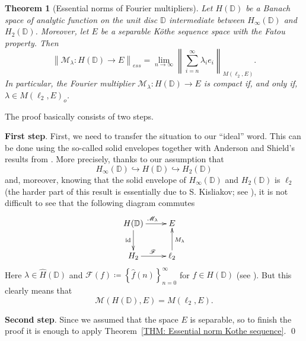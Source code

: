 \documentclass[11pt]{amsart}
\theoremstyle{definition}
\newtheorem{theorem}{Theorem}[section]
\theoremstyle{definition}
\theoremstyle{definition}
\theoremstyle{definition}
\theoremstyle{definition}
\theoremstyle{definition}
\theoremstyle{definition}
\theoremstyle{definition}
\numberwithin{equation}{section}
\numberwithin{equation}{section}
\numberwithin{equation}{section}
\theoremstyle{definition}
\theoremstyle{definition}
\theoremstyle{definition}
\theoremstyle{definition}
\theoremstyle{definition}
\theoremstyle{definition}
\newcommand{\norm}[1]{\left\lVert#1\right\rVert}
\renewenvironment{proof}{\noindent {\bf Proof.}}{\qed}
\begin{document}
\begin{theorem}[Essential norms of Fourier multipliers] \label{THM: ess norm holomorphic}
	{\it Let $H(\mathbb{D})$ be a Banach space of analytic function on the unit disc $\mathbb{D}$ intermediate between $H_{\infty}(\mathbb{D})$
		and $H_2(\mathbb{D})$. Moreover, let $E$ be a separable K{\" o}the sequence space with the Fatou property. Then}
		\begin{equation*}
			\norm{\mathscr{M}_{\lambda} \colon H(\mathbb{D}) \rightarrow E}_{ess} = \lim\limits_{n \rightarrow \infty} \norm{ \sum_{i=n}^{\infty} \lambda_i e_i }_{M(\ell_2,E)}.
		\end{equation*}
		{\it In particular, the Fourier multiplier $\mathscr{M}_{\lambda} \colon H(\mathbb{D}) \rightarrow E$ is compact if, and only if, $\lambda \in M(\ell_2,E)_o$.}
\end{theorem}
\begin{proof}
	The proof basically consists of two steps.
	
	{\bf First step}. First, we need to transfer the situation to our \enquote{ideal} word. This can be done using the so-called solid envelopes
	together with Anderson and Shield's results from \cite{AS76}. More precisely, thanks to our assumption that
	\begin{equation*}
		H_{\infty}(\mathbb{D}) \hookrightarrow H(\mathbb{D}) \hookrightarrow H_2(\mathbb{D})
	\end{equation*}
	and, moreover, knowing that the solid envelope of $H_{\infty}(\mathbb{D})$ and $H_2(\mathbb{D})$ is $\ell_2$
	(the harder part of this result is essentially due to S. Kisliakov; see \cite[Proposition~1.1]{Mle09}), it is not difficult to see that the following diagram commutes
	\begin{equation*}
		\xymatrix{
			H(\mathbb{D}) \ar[d]_{\text{id}} \ar[r]^{\mathscr{M}_{\lambda}} & E\\
			H_2 \ar[r]^{\mathscr{F}} & \ell_2 \ar[u]_{M_{\lambda}}}
	\end{equation*}
	Here $\lambda \in \widehat{H}(\mathbb{D})$ and $\mathscr{F}(f) \coloneqq \left\{ \widehat{f}(n) \right\}_{n=0}^{\infty}$ for $f \in H(\mathbb{D})$
	(see \cite[Corollary~1.2]{Mle09}). But this clearly means that
	\begin{equation*}
		\mathscr{M}(H(\mathbb{D}),E) = M(\ell_2,E).
	\end{equation*}

	{\bf Second step}. Since we assumed that the space $E$ is separable, so to finish the proof it is enough to apply Theorem~\ref{THM: Essential norm Kothe sequence}.
\end{proof}
\end{document}
